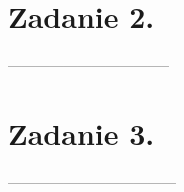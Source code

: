 \documentclass[polish,a4paper]{article}
\begin{document}
\section{Zadanie 2.}
-----------------------------------
%

\section{Zadanie 3.}
------------------------------------
%
\end{document}

